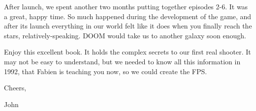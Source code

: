 \par
After launch, we spent another two months putting together episodes 2-6. It was a great, happy time. So much happened during the development of the game, and after its launch everything in our world felt like it does when you finally reach the stars, relatively-speaking. DOOM would take us to another galaxy soon enough.\\
\par
Enjoy this excellent book. It holds the complex secrets to our first real shooter. It may not be easy to understand, but we needed to know all this information in 1992, that Fabien is teaching you now, so we could create the FPS.\\
\par
Cheers,\\
\par
John